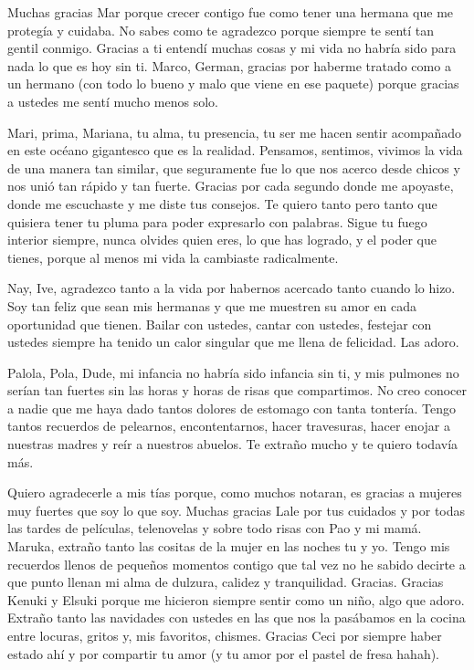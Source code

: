 Muchas gracias Mar porque crecer contigo fue como tener una hermana que me protegía y cuidaba. No sabes como te agradezco porque siempre te sentí tan gentil conmigo. Gracias a ti entendí muchas cosas y mi vida no habría sido para nada lo que es hoy sin ti. Marco, German, gracias por haberme tratado como a un hermano (con todo lo bueno y malo que viene en ese paquete) porque gracias a ustedes me sentí mucho menos solo.

Mari, prima, Mariana, tu alma, tu presencia, tu ser me hacen sentir acompañado en este océano gigantesco que es la realidad. Pensamos, sentimos, vivimos la vida de una manera tan similar, que seguramente fue lo que nos acerco desde chicos y nos unió tan rápido y tan fuerte. Gracias por cada segundo donde me apoyaste, donde me escuchaste y me diste tus consejos. Te quiero tanto pero tanto que quisiera tener tu pluma para poder expresarlo con palabras. Sigue tu fuego interior siempre, nunca olvides quien eres, lo que has logrado, y el poder que tienes, porque al menos mi vida la cambiaste radicalmente. 

Nay, Ive, agradezco tanto a la vida por habernos acercado tanto cuando lo hizo. Soy tan feliz que sean mis hermanas y que me muestren su amor en cada oportunidad que tienen. Bailar con ustedes, cantar con ustedes, festejar con ustedes siempre ha tenido un calor singular que me llena de felicidad. Las adoro.

Palola, Pola, Dude, mi infancia no habría sido infancia sin ti, y mis pulmones no serían tan fuertes sin las horas y horas de risas que compartimos. No creo conocer a nadie que me haya dado tantos dolores de estomago con tanta tontería. Tengo tantos recuerdos de pelearnos, encontentarnos, hacer travesuras, hacer enojar a nuestras madres y reír a nuestros abuelos. Te extraño mucho y te quiero todavía más.  

Quiero agradecerle a mis tías porque, como muchos notaran, es gracias a mujeres muy fuertes que soy lo que soy. Muchas gracias Lale por tus cuidados y por todas las tardes de películas, telenovelas y sobre todo risas con Pao y mi mamá. Maruka, extraño tanto las cositas de la mujer en las noches tu y yo. Tengo mis recuerdos llenos de pequeños momentos contigo que tal vez no he sabido decirte a que punto llenan mi alma de dulzura, calidez y tranquilidad. Gracias. Gracias Kenuki y Elsuki porque me hicieron siempre sentir como un niño, algo que adoro. Extraño tanto las navidades con ustedes en las que nos la pasábamos en la cocina entre locuras, gritos y, mis favoritos, chismes. Gracias Ceci por siempre haber estado ahí y por compartir tu amor (y tu amor por el pastel de fresa hahah).


